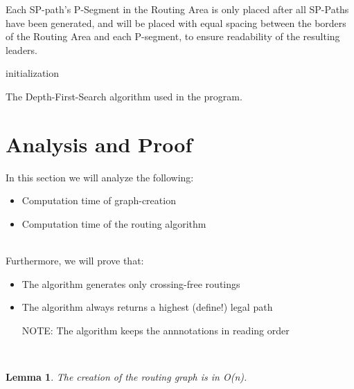 \documentclass[11pt,a4paper]{vutinfth}
\newtheorem{lemma}{Lemma}
\begin{document}
Each SP-path's P-Segment in the Routing Area is only placed after all SP-Paths have been generated, and will be placed with equal spacing between the borders of the Routing Area and each P-segment, to ensure readability of the resulting leaders.

\begin{algorithm}

\DontPrintSemicolon
{}



initialization\;
\caption{The Depth-First-Search algorithm used in the program.}
\label{alg:DFS}
\end{algorithm}



\section{Analysis and Proof}

In this section we will analyze the following:

\begin{itemize}
 \item Computation time of graph-creation
 \item Computation time of the routing algorithm
\end{itemize}
~\\
Furthermore, we will prove that:
\begin{itemize}
\item The algorithm generates only crossing-free routings
\item The algorithm always returns a highest (define!) legal path

NOTE: The algorithm keeps the annnotations in reading order
\end{itemize}
~\\
\begin{lemma}
	The creation of the routing graph is in O(n).
	\label{lem:GraphCreat}
\end{lemma}
\end{document}
